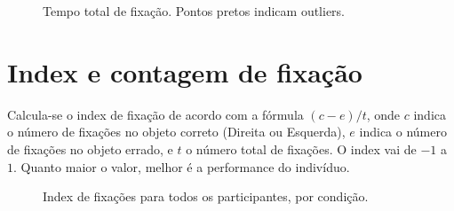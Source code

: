 \documentclass{article}
\begin{document}
\begin{figure}[]
\caption{Tempo total de fixação. Pontos pretos indicam outliers.}
\noindent{}
\centering
\end{figure}

\section{Index e contagem de fixação}

Calcula-se o index de fixação de acordo com a fórmula $(c-e)/t$, onde $c$ indica o número de fixações no objeto correto (Direita ou Esquerda), $e$ indica o número de fixações no objeto errado, e $t$ o número total de fixações. O index vai de $-1$ a $1$. Quanto maior o valor, melhor é a performance do indivíduo.

\begin{figure}[]
\caption{Index de fixações para todos os participantes, por condição.}
\noindent{}
\centering
\end{figure}
\end{document}
